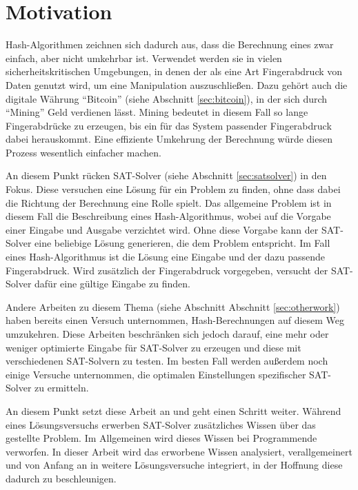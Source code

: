 \section{Motivation}

Hash-Algorithmen zeichnen sich dadurch aus, dass die Berechnung eines  zwar einfach, aber nicht umkehrbar ist.
Verwendet werden sie in vielen sicherheitskritischen Umgebungen, in denen der  als eine Art Fingerabdruck
von Daten genutzt wird, um eine Manipulation auszuschließen. Dazu gehört auch die digitale Währung "`Bitcoin"' (siehe Abschnitt
\ref{sec:bitcoin}), in der sich durch "`Mining"' Geld verdienen lässt. Mining bedeutet in diesem Fall so lange Fingerabdrücke
zu erzeugen, bis ein für das System passender Fingerabdruck dabei herauskommt. Eine effiziente Umkehrung der Berechnung würde
diesen Prozess wesentlich einfacher machen.

An diesem Punkt rücken SAT-Solver (siehe Abschnitt \ref{sec:satsolver}) in den Fokus. Diese versuchen eine Lösung für ein
Problem zu finden, ohne dass dabei die Richtung der Berechnung eine Rolle spielt. Das allgemeine Problem ist in diesem Fall
die Beschreibung eines Hash-Algorithmus, wobei auf die Vorgabe einer Eingabe und Ausgabe verzichtet wird. Ohne diese Vorgabe
kann der SAT-Solver eine beliebige Lösung generieren, die dem Problem entspricht. Im Fall eines Hash-Algorithmus ist die Lösung
eine Eingabe und der dazu passende Fingerabdruck. Wird zusätzlich der Fingerabdruck vorgegeben, versucht der SAT-Solver dafür
eine gültige Eingabe zu finden.

Andere Arbeiten zu diesem Thema (siehe Abschnitt Abschnitt \ref{sec:otherwork}) haben bereits einen Versuch unternommen,
Hash-Berechnungen auf diesem Weg umzukehren. Diese Arbeiten beschränken sich jedoch darauf, eine mehr oder weniger optimierte
Eingabe für SAT-Solver zu erzeugen und diese mit verschiedenen SAT-Solvern zu testen. Im besten Fall werden außerdem noch
einige Versuche unternommen, die optimalen Einstellungen spezifischer SAT-Solver zu ermitteln.

An diesem Punkt setzt diese Arbeit an und geht einen Schritt weiter. Während eines Lösungsversuchs erwerben SAT-Solver zusätzliches
Wissen über das gestellte Problem. Im Allgemeinen wird dieses Wissen bei Programmende verworfen. In dieser Arbeit wird das erworbene Wissen
analysiert, verallgemeinert und von Anfang an in weitere Lösungsversuche integriert, in der Hoffnung diese dadurch zu beschleunigen.